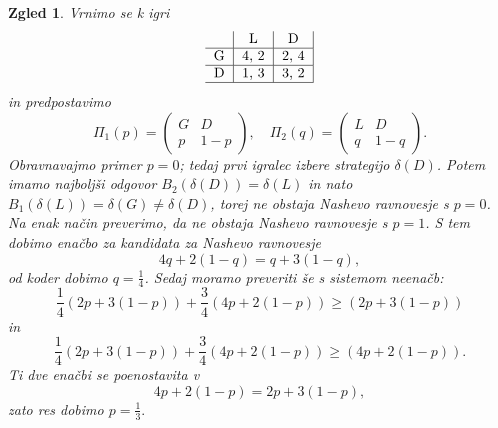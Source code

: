 \documentclass[10pt, a4paper]{article}
\newtheorem{zgled}[izr]{Zgled}
\begin{document}
\begin{zgled}
  Vrnimo se k igri 
  $$
  \begin{tabular}{c|c|c|}
    & \textrm{L} & \textrm{D}\\
    \hline
    \textrm{G} & 4, 2 & 2, 4\\
    \hline
    \textrm{D} & 1, 3 & 3, 2\\
    \hline
  \end{tabular}
  $$
  in predpostavimo 
  $$\Pi_1 (p) = \begin{pmatrix}
    G & D\\
    p & 1 - p
  \end{pmatrix}, \quad \Pi_2 (q) = \begin{pmatrix}
    L & D\\
    q & 1 - q
  \end{pmatrix}.$$
  Obravnavajmo primer $p = 0$; tedaj prvi igralec izbere strategijo $\delta(D)$.
  Potem imamo najboljši odgovor $B_2 (\delta(D)) = \delta(L)$
  in nato $B_1 (\delta(L)) = \delta(G) \neq \delta(D)$, torej ne obstaja Nashevo ravnovesje s $p = 0$.
  Na enak način preverimo, da ne obstaja Nashevo ravnovesje s $p = 1$.
  S tem dobimo enačbo za kandidata za Nashevo ravnovesje 
  $$4q + 2(1 - q) = q + 3(1 - q),$$
  od koder dobimo $q = \frac{1}{4}$.
  Sedaj moramo preveriti še s sistemom neenačb:
  $$\frac{1}{4} (2p + 3(1 - p)) + \frac{3}{4} (4p + 2(1 - p)) \geq (2p + 3(1 - p))$$
  in 
  $$\frac{1}{4} (2p + 3(1 - p)) + \frac{3}{4} (4p + 2(1 - p)) \geq (4p + 2(1 - p)).$$
  Ti dve enačbi se poenostavita v $$4p + 2(1 - p) = 2p + 3(1 - p),$$
  zato res dobimo $p = \frac{1}{3}.$
\end{zgled}
\end{document}
